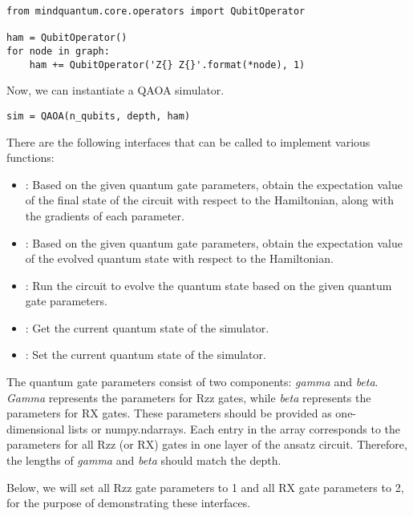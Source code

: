 \begin{lstlisting}
from mindquantum.core.operators import QubitOperator

ham = QubitOperator()
for node in graph:
    ham += QubitOperator('Z{} Z{}'.format(*node), 1)
\end{lstlisting}

Now, we can instantiate a QAOA simulator.
\begin{lstlisting}
sim = QAOA(n_qubits, depth, ham)
\end{lstlisting}

There are the following interfaces that can be called to implement various functions:

\begin{itemize}
    \item {}: Based on the given quantum gate parameters, obtain the expectation value of the final state of the circuit with respect to the Hamiltonian, along with the gradients of each parameter.
    \item {}: Based on the given quantum gate parameters, obtain the expectation value of the evolved quantum state with respect to the Hamiltonian.
    \item {}: Run the circuit to evolve the quantum state based on the given quantum gate parameters.
    \item {}: Get the current quantum state of the simulator.
    \item {}: Set the current quantum state of the simulator.
\end{itemize}

The quantum gate parameters consist of two components: \textit{gamma} and \textit{beta}. \textit{Gamma} represents the parameters for Rzz gates, while \textit{beta} represents the parameters for RX gates. These parameters should be provided as one-dimensional lists or numpy.ndarrays. Each entry in the array corresponds to the parameters for all Rzz (or RX) gates in one layer of the ansatz circuit. Therefore, the lengths of \textit{gamma} and \textit{beta} should match the depth.

Below, we will set all Rzz gate parameters to 1 and all RX gate parameters to 2, for the purpose of demonstrating these interfaces.

